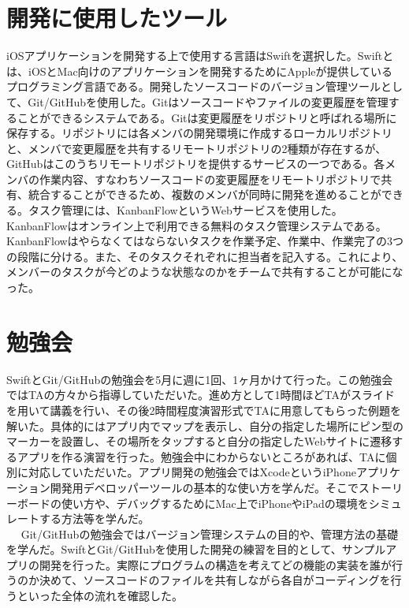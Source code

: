 \section{開発に使用したツール}

iOSアプリケーションを開発する上で使用する言語はSwiftを選択した。Swiftとは、iOSとMac向けのアプリケーションを開発するためにAppleが提供しているプログラミング言語である。開発したソースコードのバージョン管理ツールとして、Git/GitHubを使用した。Gitはソースコードやファイルの変更履歴を管理することができるシステムである。Gitは変更履歴をリポジトリと呼ばれる場所に保存する。リポジトリには各メンバの開発環境に作成するローカルリポジトリと、メンバで変更履歴を共有するリモートリポジトリの2種類が存在するが、GitHubはこのうちリモートリポジトリを提供するサービスの一つである。各メンバの作業内容、すなわちソースコードの変更履歴をリモートリポジトリで共有、統合することができるため、複数のメンバが同時に開発を進めることができる。タスク管理には、KanbanFlowというWebサービスを使用した。KanbanFlowはオンライン上で利用できる無料のタスク管理システムである。KanbanFlowはやらなくてはならないタスクを作業予定、作業中、作業完了の3つの段階に分ける。また、そのタスクそれぞれに担当者を記入する。これにより、メンバーのタスクが今どのような状態なのかをチームで共有することが可能になった。

\section{勉強会}
SwiftとGit/GitHubの勉強会を5月に週に1回、1ヶ月かけて行った。この勉強会ではTAの方々から指導していただいた。進め方として1時間ほどTAがスライドを用いて講義を行い、その後2時間程度演習形式でTAに用意してもらった例題を解いた。具体的にはアプリ内でマップを表示し、自分の指定した場所にピン型のマーカーを設置し、その場所をタップすると自分の指定したWebサイトに遷移するアプリを作る演習を行った。勉強会中にわからないところがあれば、TAに個別に対応していただいた。アプリ開発の勉強会ではXcodeというiPhoneアプリケーション開発用デベロッパーツールの基本的な使い方を学んだ。そこでストーリーボードの使い方や、デバッグするためにMac上でiPhoneやiPadの環境をシミュレートする方法等を学んだ。\\　
Git/GitHubの勉強会ではバージョン管理システムの目的や、管理方法の基礎を学んだ。SwiftとGit/GitHubを使用した開発の練習を目的として、サンプルアプリの開発を行った。実際にプログラムの構造を考えてどの機能の実装を誰が行うのか決めて、ソースコードのファイルを共有しながら各自がコーディングを行うといった全体の流れを確認した。

